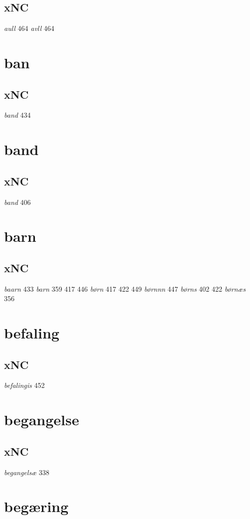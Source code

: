 \documentclass[a4paper,twocolumn]{article}
\begin{document}
\subsection{xNC}
\label{sec:org521f220}
\emph{aull} 464 \emph{avll} 464 
\section{ban}
\label{sec:orgd3d3442}
\subsection{xNC}
\label{sec:org52d9767}
\emph{band} 434 
\section{band}
\label{sec:orgd8c4e17}
\subsection{xNC}
\label{sec:orgccee22e}
\emph{band} 406 
\section{barn}
\label{sec:org7123456}
\subsection{xNC}
\label{sec:org12b034b}
\emph{baarn} 433 \emph{barn} 359 417 446 \emph{børn} 417 422 449 \emph{børnnn} 447 \emph{børns} 402 422 \emph{børnæs} 356 
\section{befaling}
\label{sec:org7755fa4}
\subsection{xNC}
\label{sec:org566641a}
\emph{befalingis} 452 
\section{begangelse}
\label{sec:org471af39}
\subsection{xNC}
\label{sec:org0009303}
\emph{begangelsæ} 338 
\section{begæring}
\label{sec:org976873e}
\end{document}

